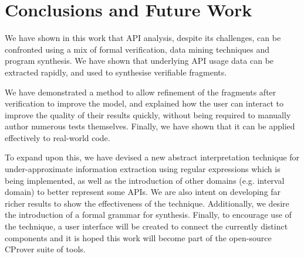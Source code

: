 \documentclass[EPiCempty]{easychair}
\begin{document}


\section{Conclusions and Future Work}
\label{sec:conclusions}
We have shown in this work that API analysis, despite its challenges, can be confronted using a mix of formal verification, data mining techniques and program synthesis.  We have shown that underlying API usage data can be extracted rapidly, and used to synthesise verifiable fragments.    

We have demonstrated a method to allow refinement of the fragments after verification to improve the model, and explained how the user can interact to improve the quality of their results quickly, without being required to manually author numerous tests themselves.  Finally, we have shown that it can be applied effectively to real-world code.

To expand upon this, we have devised a new abstract interpretation technique for under-approximate information extraction using regular expressions which is being implemented, as well as the introduction of other domains (e.g. interval domain) to better represent some APIs.   We are also intent on developing far richer results to show the effectiveness of the technique.  Additionally, we desire the introduction of a formal grammar for synthesis.
Finally, to encourage use of the technique, a user interface will be created to connect the currently distinct components and it is hoped this work will become part of the open-source CProver suite of tools.  
%



{}


\end{document}
